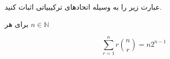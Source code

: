 \EXERCISE
عبارت زیر را به وسیله اتحاد‌های ترکیبیاتی اثبات کنید.

برای هر
$n \in \mathbb{N}$

$$\sum_{r=1}^{n}r\binom{n}{r} = n 2^{n-1}$$